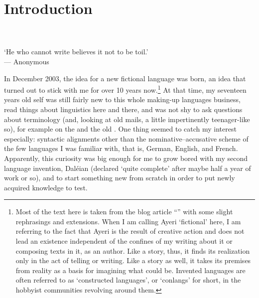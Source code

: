 \setcounter{chapter}{-1}
\chapter{Introduction}
\label{ch:introduction}

\begin{flushright}\smaller
{}\\
\\
`He who cannot write believes it not to be toil.'\\
--- Anonymous\footnotemark
\end{flushright}\bigskip


\noindent In December 2003, the idea for a new fictional language was born, an
idea that turned out to stick with me for over 10 years now.\footnote{Most of
the text here is taken from the blog article
``'' \parencite{benung:happybirthday} with some
slight rephrasings and extensions. When I am calling Ayeri `fictional' here, I
am referring to the fact that Ayeri is the result of creative action and does
not lead an existence independent of the confines of my writing about it or
composing texts in it, as an author. Like a story, thus, it finds its
realization only in the act of telling or writing. Like a story as well, it
takes its premises from reality as a basis for imagining what could be.
Invented languages are often referred to as `constructed languages', or
`conlangs' for short, in the hobbyist communities revolving around them.} At
that time, my seventeen years old self was still fairly new to this whole
making-up languages business, read things about linguistics here and there, and
was not shy to ask questions about terminology (and, looking at old mails, a
little impertinently teenager-like so), for example on the
 and the old . One thing seemed to catch
my interest especially: syntactic alignments other than the
nominative--accusative scheme of the few languages I was familiar with, that
is, German, English, and French. Apparently, this curiosity was big enough for
me to grow bored with my second language invention, Daléian (declared `quite
complete' after maybe half a year of work or so), and to start something new
from scratch in order to put newly acquired knowledge to test.

